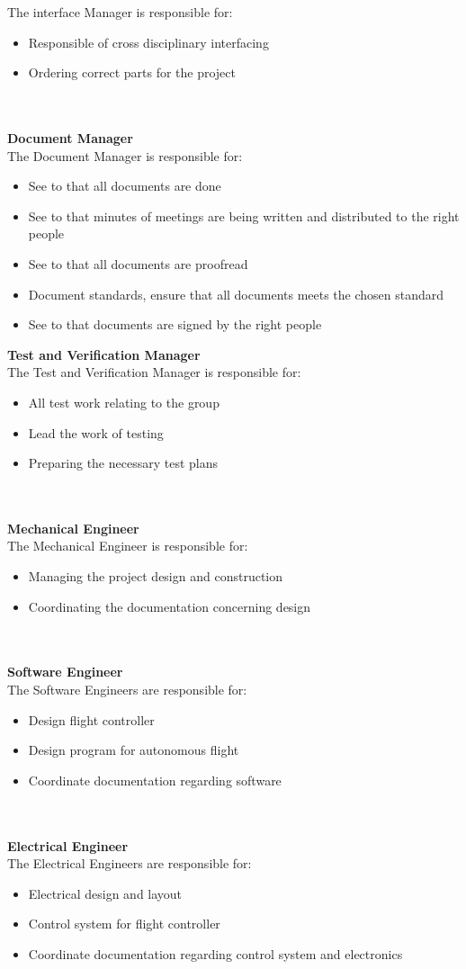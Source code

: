 The interface Manager is responsible for:
\begin{itemize}
  \item Responsible of cross disciplinary interfacing
  \item Ordering correct parts for the project
\end{itemize}
\\\\
\textbf{Document Manager}\\
The Document Manager is responsible for:
\begin{itemize}
  \item See to that all documents are done
  \item See to that minutes of meetings are being written and distributed to the right people
  \item See to that all documents are proofread
  \item Document standards, ensure that all documents meets the chosen standard 
  \item See to that documents are signed by the right people
\end{itemize}
\newpage
\noindent\textbf{Test and Verification Manager}\\
The Test and Verification Manager is responsible for:
\begin{itemize}
  \item All test work relating to the group 
  \item Lead the work of testing
  \item Preparing the necessary test plans
\end{itemize}
\\\\
\textbf{Mechanical Engineer}\\
The Mechanical Engineer is responsible for:
\begin{itemize}
  \item Managing the project design and construction
  \item Coordinating the documentation concerning design
\end{itemize}
\\\\
\textbf{Software Engineer}\\
The Software Engineers are responsible for: 
\begin{itemize}
  \item Design flight controller
  \item Design program for autonomous flight 
  \item Coordinate documentation regarding software
\end{itemize}
\\\\
\textbf{Electrical Engineer}\\
The Electrical Engineers are responsible for:
\begin{itemize}
  \item Electrical design and layout
  \item Control system for flight controller
  \item Coordinate documentation regarding control system and electronics
\end{itemize}

